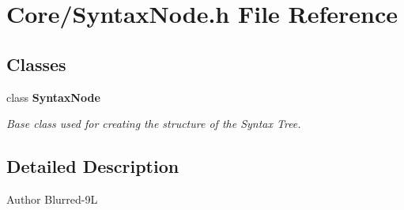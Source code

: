 \section{Core/\-Syntax\-Node.h File Reference}
\label{_syntax_node_8h}
\subsection*{Classes}
\begin{DoxyCompactItemize}
\item 
class {\bf Syntax\-Node}
\begin{DoxyCompactList}\small\item\em Base class used for creating the structure of the Syntax Tree. \end{DoxyCompactList}\end{DoxyCompactItemize}


\subsection{Detailed Description}
\begin{DoxyAuthor}{Author}
Blurred-\/9\-L 
\end{DoxyAuthor}
